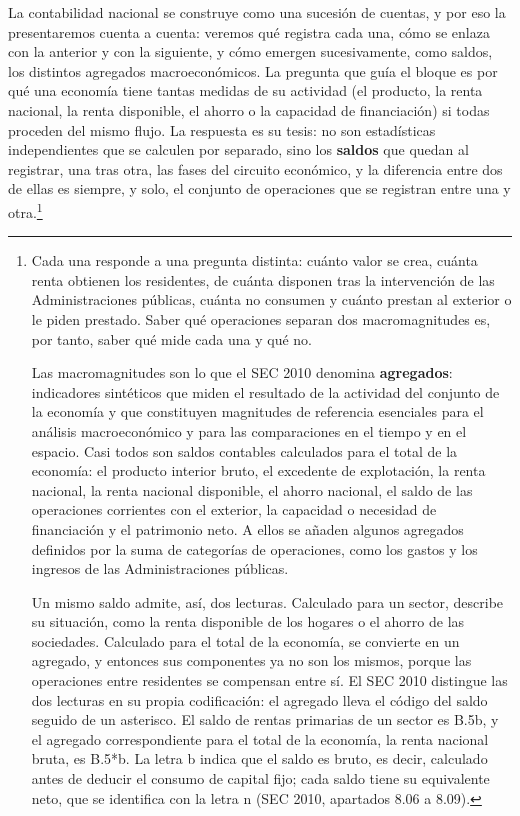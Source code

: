 \documentclass[10pt,a4paper]{article}
\begin{document}
La contabilidad nacional se construye como una sucesión de cuentas, y por eso la presentaremos cuenta a cuenta: veremos qué registra cada una, cómo se enlaza con la anterior y con la siguiente, y cómo emergen sucesivamente, como saldos, los distintos agregados macroeconómicos. La pregunta que guía el bloque es por qué una economía tiene tantas medidas de su actividad (el producto, la renta nacional, la renta disponible, el ahorro o la capacidad de financiación) si todas proceden del mismo flujo. La respuesta es su tesis: no son estadísticas independientes que se calculen por separado, sino los \textbf{saldos} que quedan al registrar, una tras otra, las fases del circuito económico, y la diferencia entre dos de ellas es siempre, y solo, el conjunto de operaciones que se registran entre una y otra.\footnote{%
  Cada una responde a una pregunta distinta: cuánto valor se crea, cuánta renta obtienen los residentes, de cuánta disponen tras la intervención de las Administraciones públicas, cuánta no consumen y cuánto prestan al exterior o le piden prestado. Saber qué operaciones separan dos macromagnitudes es, por tanto, saber qué mide cada una y qué no.

  Las macromagnitudes son lo que el SEC 2010 denomina \textbf{agregados}: indicadores sintéticos que miden el resultado de la actividad del conjunto de la economía y que constituyen magnitudes de referencia esenciales para el análisis macroeconómico y para las comparaciones en el tiempo y en el espacio. Casi todos son saldos contables calculados para el total de la economía: el producto interior bruto, el excedente de explotación, la renta nacional, la renta nacional disponible, el ahorro nacional, el saldo de las operaciones corrientes con el exterior, la capacidad o necesidad de financiación y el patrimonio neto. A ellos se añaden algunos agregados definidos por la suma de categorías de operaciones, como los gastos y los ingresos de las Administraciones públicas.

  Un mismo saldo admite, así, dos lecturas. Calculado para un sector, describe su situación, como la renta disponible de los hogares o el ahorro de las sociedades. Calculado para el total de la economía, se convierte en un agregado, y entonces sus componentes ya no son los mismos, porque las operaciones entre residentes se compensan entre sí. El SEC 2010 distingue las dos lecturas en su propia codificación: el agregado lleva el código del saldo seguido de un asterisco. El saldo de rentas primarias de un sector es B.5b, y el agregado correspondiente para el total de la economía, la renta nacional bruta, es B.5*b. La letra b indica que el saldo es bruto, es decir, calculado antes de deducir el consumo de capital fijo; cada saldo tiene su equivalente neto, que se identifica con la letra n (SEC 2010, apartados 8.06 a 8.09).
}
\end{document}

